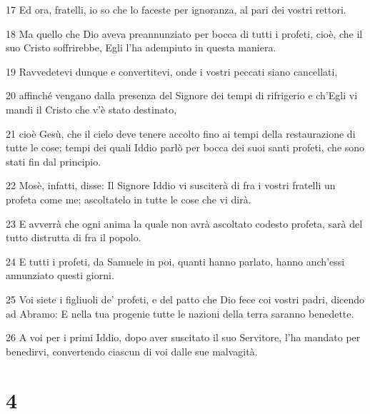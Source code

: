 \par 17 Ed ora, fratelli, io so che lo faceste per ignoranza, al pari dei vostri rettori.
\par 18 Ma quello che Dio aveva preannunziato per bocca di tutti i profeti, cioè, che il suo Cristo soffrirebbe, Egli l'ha adempiuto in questa maniera.
\par 19 Ravvedetevi dunque e convertitevi, onde i vostri peccati siano cancellati,
\par 20 affinché vengano dalla presenza del Signore dei tempi di rifrigerio e ch'Egli vi mandi il Cristo che v'è stato destinato,
\par 21 cioè Gesù, che il cielo deve tenere accolto fino ai tempi della restaurazione di tutte le cose; tempi dei quali Iddio parlò per bocca dei suoi santi profeti, che sono stati fin dal principio.
\par 22 Mosè, infatti, disse: Il Signore Iddio vi susciterà di fra i vostri fratelli un profeta come me; ascoltatelo in tutte le cose che vi dirà.
\par 23 E avverrà che ogni anima la quale non avrà ascoltato codesto profeta, sarà del tutto distrutta di fra il popolo.
\par 24 E tutti i profeti, da Samuele in poi, quanti hanno parlato, hanno anch'essi annunziato questi giorni.
\par 25 Voi siete i figliuoli de' profeti, e del patto che Dio fece coi vostri padri, dicendo ad Abramo: E nella tua progenie tutte le nazioni della terra saranno benedette.
\par 26 A voi per i primi Iddio, dopo aver suscitato il suo Servitore, l'ha mandato per benedirvi, convertendo ciascun di voi dalle sue malvagità.

\chapter{4}

